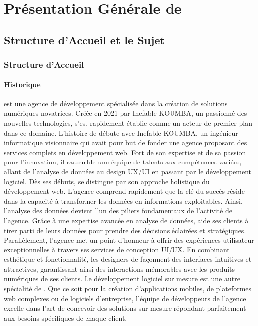 \part{Présentation Générale de \firm}
\label{part:presentation}
\chapter{Structure d’Accueil et le Sujet}
\section{Structure d’Accueil}
\subsection{Historique}

\mazf est une agence de développement spécialisée dans la création de solutions
numériques novatrices. Créée en 2021 par Inefable KOUMBA, un passionné des nouvelles
technologies, \mazf s'est rapidement établie comme un acteur de premier plan dans ce domaine.
L'histoire de \mazf débute avec Inefable KOUMBA, un ingénieur informatique
visionnaire qui avait pour but de fonder une agence proposant des services complets
en développement web. Fort de son expertise et de sa passion pour l’innovation,
il rassemble une équipe de talents aux compétences variées, allant de l’analyse
de données au design UX/UI en passant par le développement logiciel.
Dès ses débuts, \mazf se distingue par son approche holistique du développement
web. L’agence comprend rapidement que la clé du succès réside dans la capacité à
transformer les données en informations exploitables. Ainsi, l’analyse des données
devient l’un des piliers fondamentaux de l’activité de l’agence. Grâce à une
expertise avancée en analyse de données, \mazf aide ses clients à tirer
parti de leurs données pour prendre des décisions éclairées et stratégiques.
Parallèlement, l’agence met un point d’honneur à offrir des expériences utilisateur
exceptionnelles à travers ses services de conception UI/UX. En combinant esthétique
et fonctionnalité, les designers de \mazf façonnent des interfaces intuitives
et attractives, garantissant ainsi des interactions mémorables avec les produits
numériques de ses clients. Le développement logiciel sur mesure est une autre
spécialité de \mazf. Que ce soit pour la création d’applications mobiles,
de plateformes web complexes ou de logiciels d’entreprise, l’équipe de développeurs
de l’agence excelle dans l’art de concevoir des solutions sur mesure répondant
parfaitement aux besoins spécifiques de chaque client.

